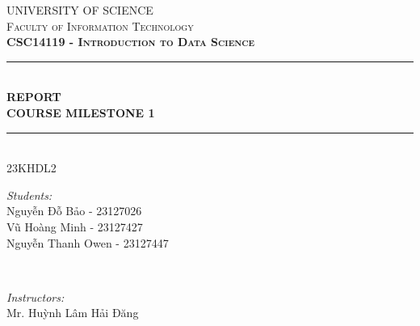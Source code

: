 \documentclass[11pt]{report}
\begin{document}
\begin{titlepage}
\textrm{}
\newcommand{\HRule}{\rule{\linewidth}{0.3mm}} %

\center %
 

\textsc{\LARGE UNIVERSITY OF SCIENCE}\\[1.0cm] %

\textsc{\Large Faculty of Information Technology}\\[0.5cm] %

\textsc{\large \bfseries CSC14119 - Introduction to Data Science}\\[1.5cm] %


\HRule \\[0.2cm]
\LARGE \bfseries REPORT\\[0.4cm]
{ \fontsize{30pt}{30pt}\selectfont \bfseries COURSE MILESTONE 1}\\[0.4pt]
\HRule \\[1.0cm]
 

\nopagebreak
\large 23KHDL2

\begin{minipage}{0.4\textwidth}
\begin{flushleft} \large
\emph{Students:}\\
Nguyễn Đỗ Bảo - 23127026 \\
Vũ Hoàng Minh - 23127427 \\
Nguyễn Thanh Owen - 23127447
\end{flushleft}
\end{minipage}
~
\begin{minipage}{0.4\textwidth}
\begin{flushright} \large
\emph{Instructors:} \\
Mr. Huỳnh Lâm Hải Đăng %
\end{flushright}
\end{minipage}\\[2cm]


 

\vfill %

\end{titlepage}
\end{document}
